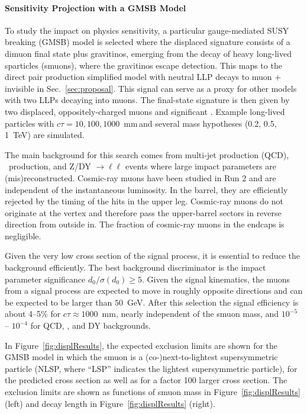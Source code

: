 \paragraph{Sensitivity Projection with a GMSB Model}

To study the impact on physics sensitivity, a particular gauge-mediated SUSY breaking (GMSB) model is selected where the displaced signature consists of a dimuon final state plus gravitinos, emerging from the decay of heavy long-lived sparticles (smuons), where the gravitinos escape detection. This maps to the direct pair production simplified model with neutral LLP decays to muon + invisible in Sec.~\ref{sec:proposal}. This signal can serve as a proxy for other models with two LLPs decaying into muons. The final-state signature is then given by two displaced, oppositely-charged muons and significant \met. Example long-lived particles with $c\tau=10, 100, 1000$~mm\,and several mass hypotheses (0.2, 0.5, 1~TeV) are simulated.

The main background for this search comes from multi-jet production (QCD), \ttbar~production, and Z/DY $\to\ell\ell$ events where large impact parameters are (mis)reconstructed. Cosmic-ray muons have been studied in Run 2 and are independent of the instantaneous luminosity. %
In the barrel, they are efficiently rejected by the timing of the hits in the upper leg. Cosmic-ray muons do not originate at the vertex and therefore pass the upper-barrel sectors in reverse direction from outside in. The fraction of cosmic-ray muons in the endcaps is negligible.

Given the very low cross section of the signal process, it is essential to reduce the background efficiently. The best background discriminator is the impact parameter significance $d_0 / \sigma (d_0) \geq 5$. Given the signal kinematics, the muons from a signal process are expected to move in roughly opposite directions and \met can be expected to be larger than $50$~GeV. After this selection the signal efficiency is about 4--5\% for $c\tau \approx 1000$~mm, nearly independent of the smuon mass, and $10^{-5}$ -- $10^{-4}$ for QCD, \ttbar, and DY backgrounds.

In Figure~\ref{fig:displResults}, the expected exclusion limits are shown for the GMSB model in which the smuon is a (co-)next-to-lightest supersymmetric particle (NLSP, where ``LSP'' indicates the lightest supersymmetric particle), for the predicted cross section as well as for a factor 100 larger cross section. The exclusion limits are shown as functions of smuon mass in Figure~\ref{fig:displResults} (left) and decay length in Figure~\ref{fig:displResults} (right).

